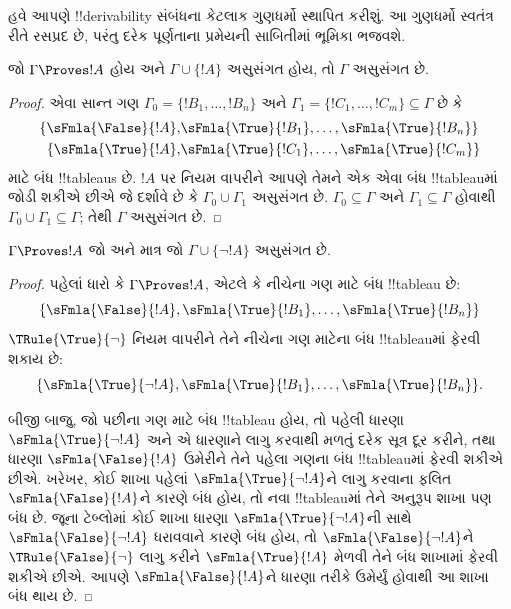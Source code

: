 \documentclass[../../../include/open-logic-section]{subfiles}
\begin{document}
      {}
      {}


હવે આપણે !!{derivability} સંબંધના કેટલાક ગુણધર્મો સ્થાપિત કરીશું. આ
ગુણધર્મો સ્વતંત્ર રીતે રસપ્રદ છે, પરંતુ દરેક પૂર્ણતાના પ્રમેયની
સાબિતીમાં ભૂમિકા ભજવશે.

\begin{prop}
  જો $\Gamma \Proves !A$ હોય અને $\Gamma \cup \{!A\}$ અસુસંગત હોય,
  તો $\Gamma$ અસુસંગત છે.
\end{prop}

\begin{proof}
એવા સાન્ત ગણ $\Gamma_0 = \{!B_1, \dots, !B_n\}$ અને $\Gamma_1
  =\{!C_1, \dots, !C_m\} \subseteq \Gamma$ છે કે
  \begin{align*}
    \{\sFmla{\False}{!A}, &
    \sFmla{\True}{!B_1}, \dots, \sFmla{\True}{!B_n}\} \\
    \{\sFmla{\True}{!A}, &
    \sFmla{\True}{!C_1}, \dots, \sFmla{\True}{!C_m}\}
  \end{align*}
  માટે બંધ !!{tableau}s છે. $!A$ પર \Cut{} નિયમ વાપરીને આપણે તેમને એક
  એવા બંધ !!{tableau}માં જોડી શકીએ છીએ જે દર્શાવે છે કે
  $\Gamma_0 \cup \Gamma_1$ અસુસંગત છે. $\Gamma_0 \subseteq \Gamma$ અને
  $\Gamma_1 \subseteq \Gamma$ હોવાથી $\Gamma_0 \cup \Gamma_1
  \subseteq \Gamma$; તેથી $\Gamma$ અસુસંગત છે.
\end{proof}

\begin{prop}
$\Gamma \Proves !A$ જો અને માત્ર જો $\Gamma \cup \{\lnot !A\}$
અસુસંગત છે.
\end{prop}

\begin{proof}
પહેલાં ધારો કે $\Gamma \Proves !A$, એટલે કે નીચેના ગણ માટે બંધ
!!{tableau} છે:
\[
\{\sFmla{\False}{!A},
\sFmla{\True}{!B_1}, \dots, \sFmla{\True}{!B_n}\}
\]
$\TRule{\True}{\lnot}$ નિયમ વાપરીને તેને નીચેના ગણ માટેના બંધ
!!{tableau}માં ફેરવી શકાય છે:
\[
\{\sFmla{\True}{\lnot !A},
\sFmla{\True}{!B_1}, \dots, \sFmla{\True}{!B_n}\}.
\]

બીજી બાજુ, જો પછીના ગણ માટે બંધ !!{tableau} હોય, તો પહેલી
ધારણા~$\sFmla{\True}{\lnot !A}$ અને એ ધારણાને
\TRule{\True}{\lnot} લાગુ કરવાથી મળતું દરેક સૂત્ર દૂર કરીને, તથા ધારણા
$\sFmla{\False}{!A}$ ઉમેરીને તેને પહેલા ગણના બંધ !!{tableau}માં ફેરવી
શકીએ છીએ. ખરેખર, કોઈ શાખા પહેલાં $\sFmla{\True}{\lnot !A}$ને
\TRule{\True}{\lnot} લાગુ કરવાના ફલિત $\sFmla{\False}{!A}$ને કારણે બંધ
હોય, તો નવા !!{tableau}માં તેને અનુરૂપ શાખા પણ બંધ છે. જૂના ટેબ્લોમાં
કોઈ શાખા ધારણા $\sFmla{\True}{\lnot !A}$ની સાથે
$\sFmla{\False}{\lnot !A}$ ધરાવવાને કારણે બંધ હોય, તો
$\sFmla{\False}{\lnot !A}$ને $\TRule{\False}{\lnot}$ લાગુ કરીને
$\sFmla{\True}{!A}$ મેળવી તેને બંધ શાખામાં ફેરવી શકીએ છીએ. આપણે
$\sFmla{\False}{!A}$ને ધારણા તરીકે ઉમેર્યું હોવાથી આ શાખા બંધ થાય છે.
\end{proof}
\end{document}
